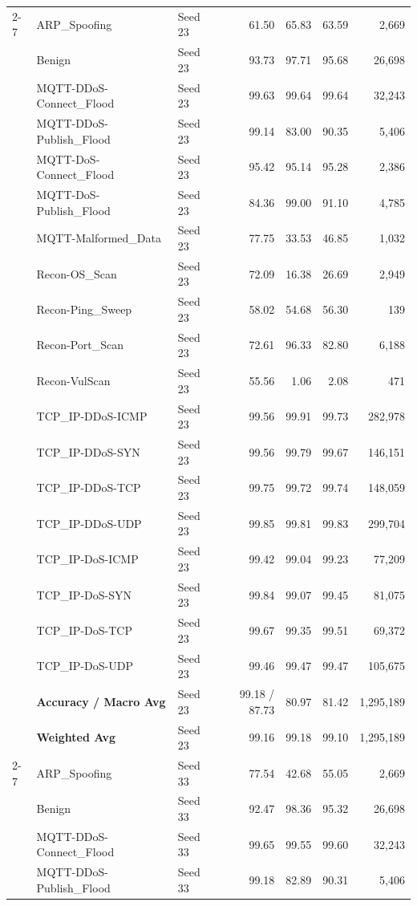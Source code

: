 \documentclass[a4paper,fleqn]{cas-sc}
\begin{document}
{\begin{landscape}
\begin{longtable}{lllrrrr}
\cline{2-7}
 & ARP\_Spoofing & Seed 23 & 61.50 & 65.83 & 63.59 & 2,669 \\
 & Benign & Seed 23 & 93.73 & 97.71 & 95.68 & 26,698 \\
 & MQTT-DDoS-Connect\_Flood & Seed 23 & 99.63 & 99.64 & 99.64 & 32,243 \\
 & MQTT-DDoS-Publish\_Flood & Seed 23 & 99.14 & 83.00 & 90.35 & 5,406 \\
 & MQTT-DoS-Connect\_Flood & Seed 23 & 95.42 & 95.14 & 95.28 & 2,386 \\
 & MQTT-DoS-Publish\_Flood & Seed 23 & 84.36 & 99.00 & 91.10 & 4,785 \\
 & MQTT-Malformed\_Data & Seed 23 & 77.75 & 33.53 & 46.85 & 1,032 \\
 & Recon-OS\_Scan & Seed 23 & 72.09 & 16.38 & 26.69 & 2,949 \\
 & Recon-Ping\_Sweep & Seed 23 & 58.02 & 54.68 & 56.30 & 139 \\
 & Recon-Port\_Scan & Seed 23 & 72.61 & 96.33 & 82.80 & 6,188 \\
 & Recon-VulScan & Seed 23 & 55.56 & 1.06 & 2.08 & 471 \\
 & TCP\_IP-DDoS-ICMP & Seed 23 & 99.56 & 99.91 & 99.73 & 282,978 \\
 & TCP\_IP-DDoS-SYN & Seed 23 & 99.56 & 99.79 & 99.67 & 146,151 \\
 & TCP\_IP-DDoS-TCP & Seed 23 & 99.75 & 99.72 & 99.74 & 148,059 \\
 & TCP\_IP-DDoS-UDP & Seed 23 & 99.85 & 99.81 & 99.83 & 299,704 \\
 & TCP\_IP-DoS-ICMP & Seed 23 & 99.42 & 99.04 & 99.23 & 77,209 \\
 & TCP\_IP-DoS-SYN & Seed 23 & 99.84 & 99.07 & 99.45 & 81,075 \\
 & TCP\_IP-DoS-TCP & Seed 23 & 99.67 & 99.35 & 99.51 & 69,372 \\
 & TCP\_IP-DoS-UDP & Seed 23 & 99.46 & 99.47 & 99.47 & 105,675 \\
 & \textbf{Accuracy / Macro Avg} & Seed 23 & 99.18 / 87.73 & 80.97 & 81.42 & 1,295,189 \\
 & \textbf{Weighted Avg} & Seed 23 & 99.16 & 99.18 & 99.10 & 1,295,189 \\
\cline{2-7}
 & ARP\_Spoofing & Seed 33 & 77.54 & 42.68 & 55.05 & 2,669 \\
 & Benign & Seed 33 & 92.47 & 98.36 & 95.32 & 26,698 \\
 & MQTT-DDoS-Connect\_Flood & Seed 33 & 99.65 & 99.55 & 99.60 & 32,243 \\
 & MQTT-DDoS-Publish\_Flood & Seed 33 & 99.18 & 82.89 & 90.31 & 5,406 \\

\end{longtable}
\end{landscape}}
\end{document}
